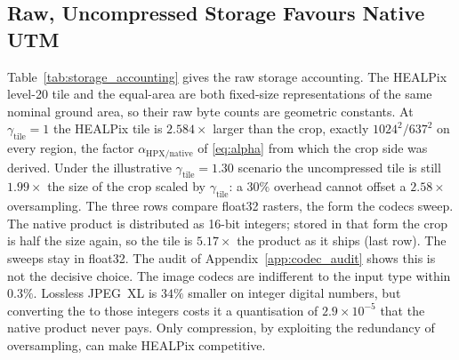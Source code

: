 \subsection{Raw, Uncompressed Storage Favours Native UTM}


Table~\ref{tab:storage_accounting} gives the raw storage accounting. The
HEALPix level-20 tile and the equal-area  are both fixed-size
representations of the same nominal ground area, so their raw byte
counts are geometric constants. At $\gamma_{\mathrm{tile}}=1$ the HEALPix tile is
$2.584\times$ larger than the crop, exactly $1024^2/637^2$ on every
region, the factor $\alpha_{\mathrm{HPX/native}}$ of \eqref{eq:alpha}
from which the crop side was derived. Under the illustrative
$\gamma_{\mathrm{tile}}=1.30$ scenario the uncompressed tile is still
$1.99\times$ the size of the crop scaled by $\gamma_{\mathrm{tile}}$: a
$30\%$ overhead cannot offset a $2.58\times$ oversampling. The three
rows compare float32 rasters, the form the codecs sweep. The native
product is distributed as 16-bit integers; stored in that form the crop
is half the size again, so the tile is $5.17\times$ the product as it
ships (last row). The sweeps stay in float32. The audit of
Appendix~\ref{app:codec_audit} shows this is not the decisive choice.
The image codecs are indifferent to the input type within $0.3\%$.
Lossless JPEG~XL is $34\%$ smaller on integer digital numbers, but
converting the  to those integers costs it a quantisation of
$2.9\times10^{-5}$ that the native product never pays.
Only compression, by exploiting the redundancy of oversampling,
can make HEALPix competitive.
